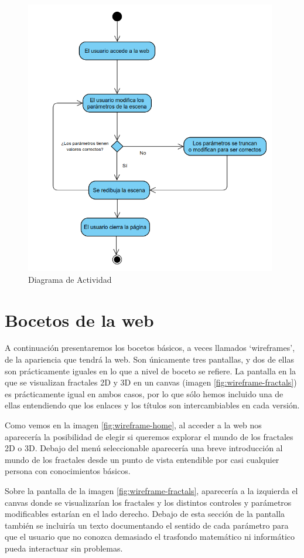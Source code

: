 \newpage
\begin{figure} [ht]
    \centering
    \includegraphics[width=11cm]{img/C6/diagrama-actividad.png}
    \caption{Diagrama de Actividad}
        \label{fig:diagrama-actividad}
    \end{figure}


\section{Bocetos de la web}


A continuación presentaremos los bocetos básicos, a veces llamados `wireframes', de la apariencia que tendrá la web. Son únicamente tres pantallas, y dos de ellas son prácticamente iguales en lo que a nivel de boceto se refiere. La pantalla en la que se visualizan fractales 2D y 3D en un canvas (imagen \ref{fig:wireframe-fractals}) es prácticamente igual en ambos casos, por lo que sólo hemos incluido una de ellas entendiendo que los enlaces y los títulos son intercambiables en cada versión. 


Como vemos en la imagen \ref{fig:wireframe-home}, al acceder a la web nos aparecería la posibilidad de elegir si queremos explorar el mundo de los fractales 2D o 3D. Debajo del menú seleccionable aparecería una breve introducción al mundo de los fractales desde un punto de vista entendible por casi cualquier persona con conocimientos básicos.

Sobre la pantalla de la imagen \ref{fig:wireframe-fractals}, aparecería a la izquierda el canvas donde se visualizarían los fractales y los distintos controles y parámetros modificables estarían en el lado derecho. Debajo de esta sección de la pantalla también se incluiría un texto documentando el sentido de cada parámetro para que el usuario que no conozca demasiado el trasfondo matemático ni informático pueda interactuar sin problemas.
\newpage


